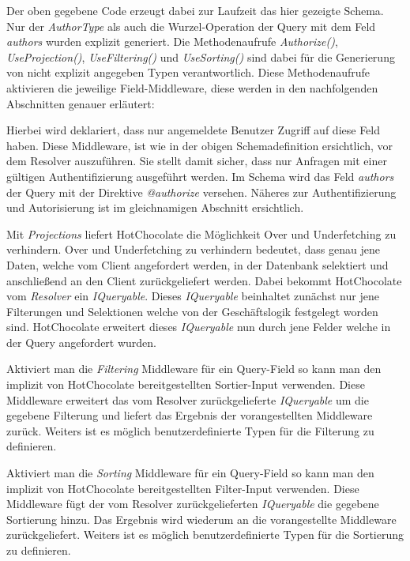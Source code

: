 Der oben gegebene Code erzeugt dabei zur Laufzeit das hier gezeigte Schema.
Nur der \textit{AuthorType} als auch die Wurzel-Operation der Query mit dem Feld \textit{authors} wurden explizit generiert.
Die Methodenaufrufe \textit{Authorize()}, \textit{UseProjection()}, \textit{UseFiltering()} und \textit{UseSorting()} sind dabei für die Generierung von nicht explizit angegeben Typen verantwortlich.
Diese Methodenaufrufe aktivieren die jeweilige Field-Middleware, diese werden in den nachfolgenden Abschnitten genauer erläutert:

Hierbei wird deklariert, dass nur angemeldete Benutzer Zugriff auf diese Feld haben.
Diese Middleware, ist wie in der obigen Schemadefinition ersichtlich, vor dem Resolver auszuführen.
Sie stellt damit sicher, dass nur Anfragen mit einer gültigen Authentifizierung ausgeführt werden.
Im Schema wird das Feld \textit{authors} der Query mit der Direktive \textit{@authorize} versehen.
Näheres zur Authentifizierung und Autorisierung ist im gleichnamigen Abschnitt ersichtlich.

Mit \textit{Projections} liefert HotChocolate die Möglichkeit Over und Underfetching zu verhindern.
Over und Underfetching zu verhindern bedeutet, dass genau jene Daten, welche vom Client angefordert werden, in der Datenbank selektiert und anschließend an den Client zurückgeliefert werden.
Dabei bekommt HotChocolate vom \textit{Resolver} ein \textit{IQueryable}.
Dieses \textit{IQueryable} beinhaltet zunächst nur jene Filterungen und Selektionen welche von der Geschäftslogik festgelegt worden sind.
HotChocolate erweitert dieses \textit{IQueryable} nun durch jene Felder welche in der Query angefordert wurden.

Aktiviert man die \textit{Filtering} Middleware für ein Query-Field so kann man den implizit von HotChocolate bereitgestellten Sortier-Input verwenden.
Diese Middleware erweitert das vom Resolver zurückgelieferte \textit{IQueryable} um die gegebene Filterung und liefert das Ergebnis der vorangestellten Middleware zurück.
Weiters ist es möglich benutzerdefinierte Typen für die Filterung zu definieren.

Aktiviert man die \textit{Sorting} Middleware für ein Query-Field so kann man den implizit von HotChocolate bereitgestellten Filter-Input verwenden.
Diese Middleware fügt der vom Resolver zurückgelieferten \textit{IQueryable} die gegebene Sortierung hinzu.
Das Ergebnis wird wiederum an die vorangestellte Middleware zurückgeliefert.
Weiters ist es möglich benutzerdefinierte Typen für die Sortierung zu definieren.

